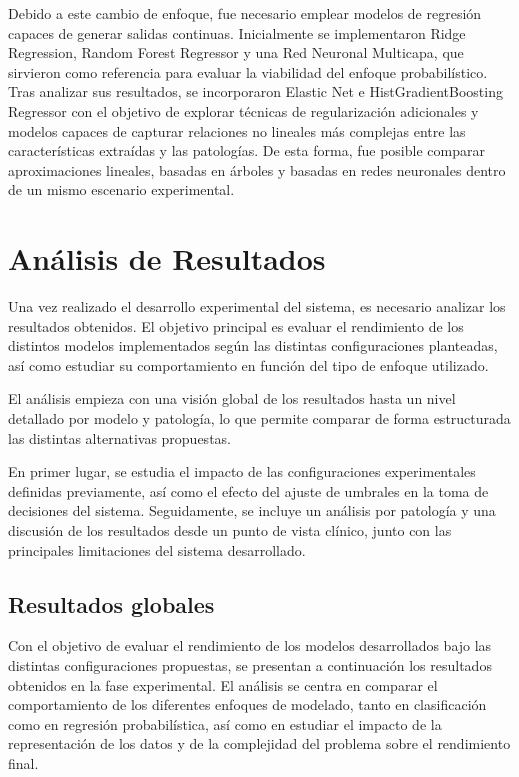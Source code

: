\documentclass[12pt,a4paper,twoside]{book}
\begin{document}
Debido a este cambio de enfoque, fue necesario emplear modelos de regresión capaces de generar salidas continuas. 
Inicialmente se implementaron Ridge Regression, Random Forest Regressor y una Red Neuronal Multicapa, que sirvieron como referencia para evaluar la viabilidad del enfoque probabilístico. 
Tras analizar sus resultados, se incorporaron Elastic Net e HistGradientBoosting Regressor con el objetivo de explorar técnicas de regularización adicionales y modelos capaces de capturar relaciones no lineales más complejas entre las características extraídas y las patologías. 
De esta forma, fue posible comparar aproximaciones lineales, basadas en árboles y basadas en redes neuronales dentro de un mismo escenario experimental. 



\chapter{Análisis de Resultados}

Una vez realizado el desarrollo experimental del sistema, es necesario analizar los resultados obtenidos.
El objetivo principal es evaluar el rendimiento de los distintos modelos implementados según las distintas configuraciones planteadas, así como estudiar su comportamiento en función del tipo de enfoque utilizado.

El análisis empieza con una visión global de los resultados hasta un nivel detallado por modelo y patología, lo que permite comparar de forma estructurada las distintas alternativas propuestas.

En primer lugar, se estudia el impacto de las configuraciones experimentales definidas previamente, así como el efecto del ajuste de umbrales en la toma de decisiones del sistema. 
Seguidamente, se incluye un análisis por patología y una discusión de los resultados desde un punto de vista clínico, junto con las principales limitaciones del sistema desarrollado.

\section{Resultados globales}
\label{sec:resultados-globales}

Con el objetivo de evaluar el rendimiento de los modelos desarrollados bajo las distintas configuraciones propuestas, se presentan a continuación los resultados obtenidos en la fase experimental.
El análisis se centra en comparar el comportamiento de los diferentes enfoques de modelado, tanto en clasificación como en regresión probabilística, así como en estudiar el impacto de la representación de los datos y de la complejidad del problema sobre el rendimiento final.
\end{document}

